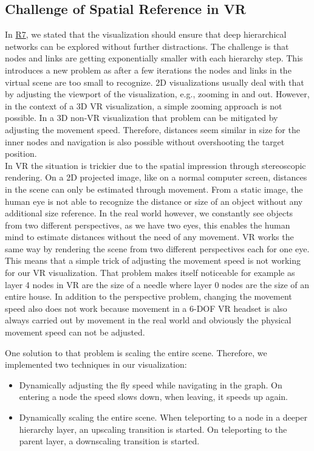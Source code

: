 \subsection{Challenge of Spatial Reference in VR}
\label{chap:ps-spatialReference}
In \hyperref[req:R7]{R7}, we stated that the visualization should ensure that deep hierarchical networks can be explored without further distractions.
The challenge is that nodes and links are getting exponentially smaller with each hierarchy step.
This introduces a new problem as after a few iterations the nodes and links in the virtual scene are too small to recognize.
2D visualizations usually deal with that by adjusting the viewport of the visualization, e.g., zooming in and out. 
However, in the context of a 3D VR visualization, a simple zooming approach is not possible. 
In a 3D non-VR visualization that problem can be mitigated by adjusting the movement speed. Therefore, distances seem similar in size for the inner nodes and navigation is also possible without overshooting the target position.\\ 
In VR the situation is trickier due to the spatial impression through stereoscopic rendering. On a 2D projected image, like on a normal computer screen, distances in the scene can only be estimated through movement. From a static image, the human eye is not able to recognize the distance or size of an object without any additional size reference. 
In the real world however, we constantly see objects from two different perspectives, as we have two eyes, this enables the human mind to estimate distances without the need of any movement. VR works the same way by rendering the scene from two different perspectives each for one eye.  
This means that a simple trick of adjusting the movement speed is not working for our VR visualization.
That problem makes itself noticeable for example as layer 4 nodes in VR are the size of a needle where layer 0 nodes are the size of an entire house.
In addition to the perspective problem, changing the movement speed also does not work because movement in a 6-DOF VR headset is also always carried out by movement in the real world and obviously the physical movement speed can not be adjusted.

One solution to that problem is scaling the entire scene. Therefore, we implemented two techniques in our visualization:
\begin{itemize}
    \item Dynamically adjusting the fly speed while navigating in the graph. On entering a node the speed slows down, when leaving, it speeds up again. 
    \item Dynamically scaling the entire scene. When teleporting to a node in a deeper hierarchy layer, an upscaling transition is started. On teleporting to the parent layer, a downscaling transition is started. 
\end{itemize} 

